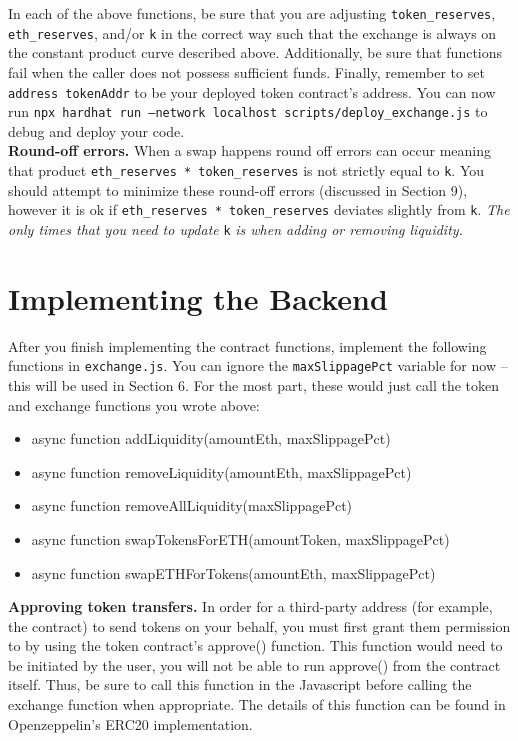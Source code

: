 \documentclass[11pt]{article}
\begin{document}
In each of the above functions, be sure that you are adjusting \texttt{token\_reserves}, \texttt{eth\_reserves}, and/or \texttt{k} in the correct way such that the exchange is always on the constant product curve described above. Additionally, be sure that functions fail when the caller does not possess sufficient funds. Finally, remember to set \texttt{address tokenAddr} to be your deployed token contract's address. You can now run \texttt{npx hardhat run --network localhost scripts/deploy\_exchange.js} to debug and deploy your code. \\

    \textbf{Round-off errors.} When a swap happens round off errors can occur meaning that product \texttt{eth\_reserves * token\_reserves} is not strictly equal to \texttt{k}. You should attempt to minimize these round-off errors (discussed in Section 9), however it is ok if \texttt{eth\_reserves * token\_reserves} deviates slightly from \texttt{k}. \textit{The only times that you need to update} \texttt{k} \textit{is when adding or removing liquidity.}

\section{Implementing the Backend}
After you finish implementing the contract functions, implement the following functions in \texttt{exchange.js}. You can ignore the \texttt{maxSlippagePct} variable for now -- this will be used in Section 6. For the most part, these would just call the token and exchange functions you wrote above:
\begin{itemize}
    \item async function addLiquidity(amountEth, maxSlippagePct)
    \item async function removeLiquidity(amountEth, maxSlippagePct)
    \item async function removeAllLiquidity(maxSlippagePct)
    \item async function swapTokensForETH(amountToken, maxSlippagePct)
    \item async function swapETHForTokens(amountEth, maxSlippagePct)
\end{itemize}

    \textbf{Approving token transfers.} In order for a third-party address (for example, the contract) to send tokens on your behalf, you must first grant them permission to by using the token contract's approve() function. This function would need to be initiated by the user, you will not be able to run approve() from the contract itself. Thus, be sure to call this function in the Javascript before calling the exchange function when appropriate. The details of this function can be found in Openzeppelin's ERC20 implementation.\\
\end{document}
